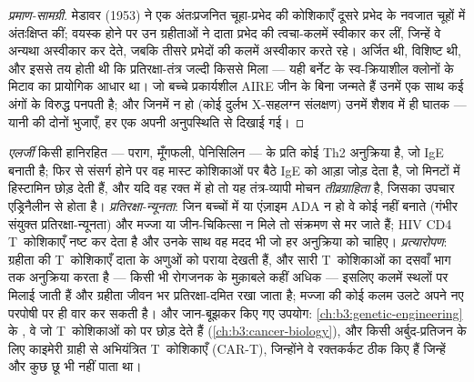 \begin{proof}[प्रमाण-सामग्री]
मेडावर (1953) ने एक अंतःप्रजनित चूहा-प्रभेद की कोशिकाएँ दूसरे प्रभेद
के नवजात चूहों में अंतःक्षिप्त कीं; वयस्क होने पर उन ग्रहीताओं ने दाता
प्रभेद की त्वचा-कलमें स्वीकार कर लीं, जिन्हें वे अन्यथा अस्वीकार कर
देते, जबकि तीसरे प्रभेदों की कलमें अस्वीकार करते रहे।  अर्जित
थी, विशिष्ट थी, और इससे तय होती थी कि प्रतिरक्षा-तंत्र जल्दी किससे
मिला --- यही बर्नेट के स्व-क्रियाशील क्लोनों के मिटाव का प्रायोगिक
आधार था। जो बच्चे प्रकार्यशील AIRE जीन के बिना जन्मते हैं उनमें एक साथ
कई अंगों के विरुद्ध  पनपती है; और जिनमें  न हो
(कोई दुर्लभ X-सहलग्न संलक्षण) उनमें शैशव में ही घातक  ---
यानी  की दोनों भुजाएँ, हर एक अपनी अनुपस्थिति से दिखाई गई।
\end{proof}

\begin{example}[अतिसंवेदनशीलता, न्यूनता, प्रत्यारोपण]\label{ex:b3:adaptive-immunity:failures}
\emph{एलर्जी} किसी हानिरहित  --- पराग, मूँगफली, पेनिसिलिन ---
के प्रति कोई Th2 अनुक्रिया है, जो IgE बनाती है; फिर से संसर्ग होने पर
वह  मास्ट कोशिकाओं पर बैठे IgE को आड़ा जोड़ देता है, जो मिनटों
में हिस्टामिन छोड़ देती हैं, और यदि वह  रक्त में हो तो यह
तंत्र-व्यापी मोचन \emph{तीव्रग्राहिता} है, जिसका उपचार एड्रिनैलीन से
होता है। \emph{प्रतिरक्षा-न्यूनता}: जिन बच्चों में  या एंज़ाइम ADA न
हो वे कोई  नहीं बनाते (गंभीर संयुक्त प्रतिरक्षा-न्यूनता) और
मज्जा या जीन-चिकित्सा न मिले तो संक्रमण से मर जाते हैं; HIV CD4
T~कोशिकाएँ नष्ट कर देता है और उनके साथ वह मदद भी जो हर अनुक्रिया को
चाहिए। \emph{प्रत्यारोपण}: ग्रहीता की T~कोशिकाएँ दाता के  अणुओं को
पराया देखती हैं, और सारी T~कोशिकाओं का दसवाँ भाग तक अनुक्रिया करता है
--- किसी भी रोगजनक के मुक़ाबले कहीं अधिक --- इसलिए कलमें  स्थलों पर
मिलाई जाती हैं और ग्रहीता जीवन भर प्रतिरक्षा-दमित रखा जाता है; मज्जा
की कोई कलम उलटे अपने नए परपोषी पर ही वार कर सकती है। और जान-बूझकर किए
गए उपयोग: \cref{ch:b3:genetic-engineering} के , वे
 जो T~कोशिकाओं को  पर छोड़ देते हैं
(\cref{ch:b3:cancer-biology}), और किसी अर्बुद-प्रतिजन के लिए काइमेरी
ग्राही से अभियंत्रित T~कोशिकाएँ (CAR-T), जिन्होंने वे रक्तकर्कट ठीक
किए हैं जिन्हें और कुछ छू भी नहीं पाता था।
\end{example}

